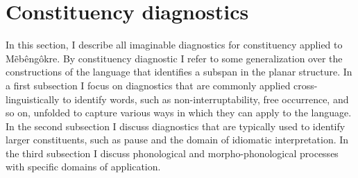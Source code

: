 \documentclass[output=paper]{langscibook}
\begin{document}


\section{Constituency diagnostics}

In this section, I describe all imaginable diagnostics for constituency applied to Mẽbêngôkre. By constituency diagnostic I refer to some generalization over the constructions of the language that identifies a subspan in the planar structure. In a first subsection I focus on diagnostics that are commonly applied cross-linguistically to identify words, such as non-interruptability, free occurrence, and so on, unfolded to capture various ways in which they can apply to the language. In the second subsection I discuss diagnostics that are typically used to identify larger constituents, such as pause and the domain of idiomatic interpretation. In the third subsection I discuss phonological and morpho-phonological processes with specific domains of application.
\end{document}
